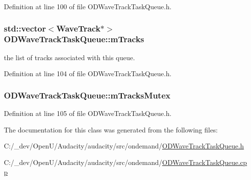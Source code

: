 Definition at line 100 of file O\+D\+Wave\+Track\+Task\+Queue.\+h.

\subsubsection[{\texorpdfstring{m\+Tracks}{mTracks}}]{\setlength{\rightskip}{0pt plus 5cm}std\+::vector$<${\bf Wave\+Track}$\ast$$>$ O\+D\+Wave\+Track\+Task\+Queue\+::m\+Tracks\hspace{0.3cm}{\ttfamily [protected]}}\hypertarget{class_o_d_wave_track_task_queue_ac7ae645d36f3a3769316e929d84a3dd4}{}\label{class_o_d_wave_track_task_queue_ac7ae645d36f3a3769316e929d84a3dd4}


the list of tracks associated with this queue. 



Definition at line 104 of file O\+D\+Wave\+Track\+Task\+Queue.\+h.

\subsubsection[{\texorpdfstring{m\+Tracks\+Mutex}{mTracksMutex}}]{ O\+D\+Wave\+Track\+Task\+Queue\+::m\+Tracks\+Mutex\hspace{0.3cm}{\ttfamily [protected]}}\hypertarget{class_o_d_wave_track_task_queue_a100b3f3b1091b8abc5b30e3365f8e5b3}{}\label{class_o_d_wave_track_task_queue_a100b3f3b1091b8abc5b30e3365f8e5b3}


Definition at line 105 of file O\+D\+Wave\+Track\+Task\+Queue.\+h.



The documentation for this class was generated from the following files\+:\begin{DoxyCompactItemize}
\item 
C\+:/\+\_\+dev/\+Open\+U/\+Audacity/audacity/src/ondemand/\hyperlink{_o_d_wave_track_task_queue_8h}{O\+D\+Wave\+Track\+Task\+Queue.\+h}\item 
C\+:/\+\_\+dev/\+Open\+U/\+Audacity/audacity/src/ondemand/\hyperlink{_o_d_wave_track_task_queue_8cpp}{O\+D\+Wave\+Track\+Task\+Queue.\+cpp}\end{DoxyCompactItemize}

